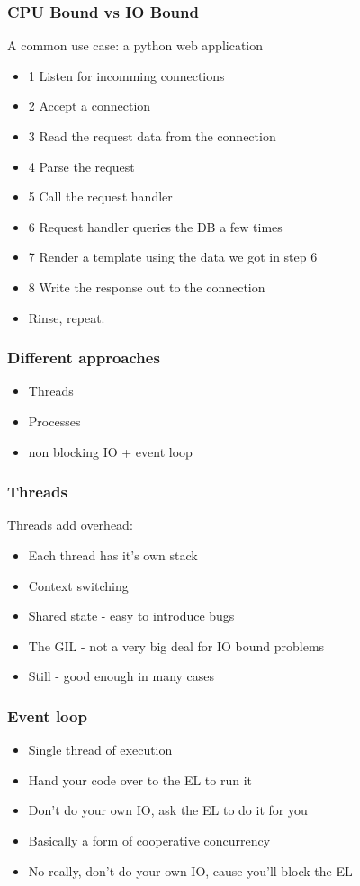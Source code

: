 \documentclass{beamer}
\begin{document}
\begin{frame}
  \frametitle{CPU Bound vs IO Bound}
  A common use case: a python web application
  \begin{itemize}
  \item 1 Listen for incomming connections
  \item 2 Accept a connection
  \item 3 Read the request data from the connection
  \item \colorbox{yellow!30}{4 Parse the request}
  \item \colorbox{yellow!30}{5 Call the request handler}
  \item 6 Request handler queries the DB a few times
  \item \colorbox{yellow!30}{7 Render a template using the data we got in step 6}
  \item 8 Write the response out to the connection
  \item Rinse, repeat.
  \end{itemize}
\end{frame}

\begin{frame}
  \frametitle{Different approaches}
  \begin{itemize}
  \item Threads
  \item Processes
  \item non blocking IO + event loop
  \end{itemize}
\end{frame}

\begin{frame}
  \frametitle{Threads}
  Threads add overhead:
  \begin{itemize}
  \item Each thread has it's own stack
  \item Context switching
  \item Shared state - easy to introduce bugs
  \item The GIL - not a very big deal for IO bound problems
  \item Still - good enough in many cases
  \end{itemize}
\end{frame}

\begin{frame}
  \frametitle{Event loop}
  \begin{itemize}
  \item Single thread of execution
  \item Hand your code over to the EL to run it
  \item Don't do your own IO, ask the EL to do it for you
  \item Basically a form of cooperative concurrency
  \item No really, don't do your own IO, cause you'll block the EL
  \end{itemize}
\end{frame}
\end{document}
